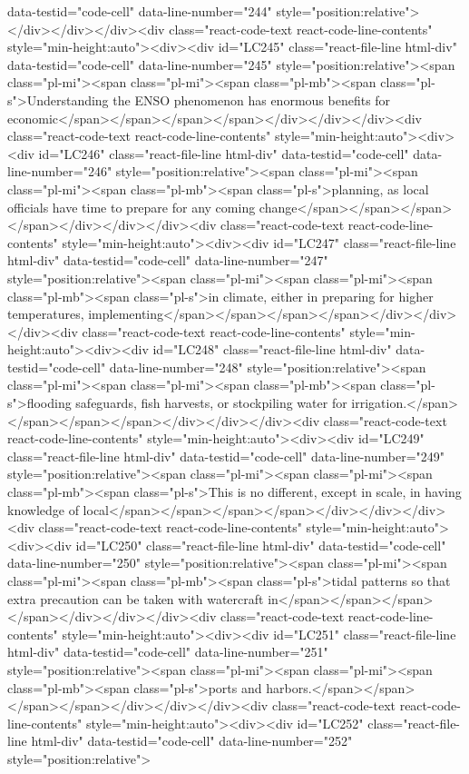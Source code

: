 {{{data-testid="code-cell" data-line-number="244" style="position:relative">
</div></div></div><div class="react-code-text react-code-line-contents" style="min-height:auto"><div><div id="LC245" class="react-file-line html-div" data-testid="code-cell" data-line-number="245" style="position:relative"><span class="pl-mi"><span class="pl-mi"><span class="pl-mb"><span class="pl-s">Understanding the ENSO phenomenon has enormous benefits for economic</span></span></span></span></div></div></div><div class="react-code-text react-code-line-contents" style="min-height:auto"><div><div id="LC246" class="react-file-line html-div" data-testid="code-cell" data-line-number="246" style="position:relative"><span class="pl-mi"><span class="pl-mi"><span class="pl-mb"><span class="pl-s">planning, as local officials have time to prepare for any coming change</span></span></span></span></div></div></div><div class="react-code-text react-code-line-contents" style="min-height:auto"><div><div id="LC247" class="react-file-line html-div" data-testid="code-cell" data-line-number="247" style="position:relative"><span class="pl-mi"><span class="pl-mi"><span class="pl-mb"><span class="pl-s">in climate, either in preparing for higher temperatures, implementing</span></span></span></span></div></div></div><div class="react-code-text react-code-line-contents" style="min-height:auto"><div><div id="LC248" class="react-file-line html-div" data-testid="code-cell" data-line-number="248" style="position:relative"><span class="pl-mi"><span class="pl-mi"><span class="pl-mb"><span class="pl-s">flooding safeguards, fish harvests, or stockpiling water for irrigation.</span></span></span></span></div></div></div><div class="react-code-text react-code-line-contents" style="min-height:auto"><div><div id="LC249" class="react-file-line html-div" data-testid="code-cell" data-line-number="249" style="position:relative"><span class="pl-mi"><span class="pl-mi"><span class="pl-mb"><span class="pl-s">This is no different, except in scale, in having knowledge of local</span></span></span></span></div></div></div><div class="react-code-text react-code-line-contents" style="min-height:auto"><div><div id="LC250" class="react-file-line html-div" data-testid="code-cell" data-line-number="250" style="position:relative"><span class="pl-mi"><span class="pl-mi"><span class="pl-mb"><span class="pl-s">tidal patterns so that extra precaution can be taken with watercraft in</span></span></span></span></div></div></div><div class="react-code-text react-code-line-contents" style="min-height:auto"><div><div id="LC251" class="react-file-line html-div" data-testid="code-cell" data-line-number="251" style="position:relative"><span class="pl-mi"><span class="pl-mi"><span class="pl-mb"><span class="pl-s">ports and harbors.</span></span></span></span></div></div></div><div class="react-code-text react-code-line-contents" style="min-height:auto"><div><div id="LC252" class="react-file-line html-div" data-testid="code-cell" data-line-number="252" style="position:relative">
}}}
